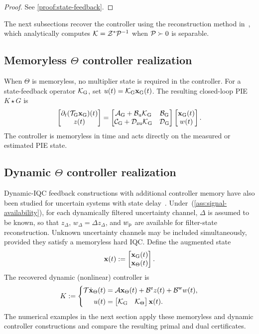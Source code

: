 \begin{proof}
    See \ref{proof:state-feedback}.
\end{proof}
The next subsections recover the controller using the reconstruction method
in~\cite[Sec.~VII]{shivaknew}, which analytically computes
$\mathcal{K}=\mathcal{Z}^*\mathcal{P}^{-1}$ when $\mathcal{P}\succ0$ is separable.

\subsection{Memoryless $\Theta$ controller realization}

When $\Theta$ is memoryless, no multiplier state is
required in the controller. For a state-feedback operator $\mathcal{K}_{{\mathrm{G}}}$, set
$u(t)=\mathcal{K}_{{\mathrm{G}}}\mathbf{x}_{{\mathrm{G}}}(t)$. The resulting closed-loop PIE
$K\star G$ is
\begin{equation*}
\begin{bmatrix}\partial_t(\mathcal{T}_{{\mathrm{G}}}\mathbf{x}_{{\mathrm{G}}})(t)\\z(t)\end{bmatrix}
=
\begin{bmatrix}
\mathcal{A}_{{\mathrm{G}}}+\mathcal{B}_{{\mathrm{u}}}\mathcal{K}_{{\mathrm{G}}}&\mathcal{B}_{{\mathrm{G}}}\\
\mathcal{C}_{{\mathrm{G}}}+\mathcal{D}_{{\mathrm{zu}}}\mathcal{K}_{{\mathrm{G}}}&\mathcal{D}_{{\mathrm{G}}}
\end{bmatrix}
\begin{bmatrix}\mathbf{x}_{{\mathrm{G}}}(t)\\w(t)\end{bmatrix}.
\end{equation*}
The controller is memoryless in time and acts directly on the measured or estimated
PIE state.

\subsection{Dynamic $\Theta$ controller realization}

Dynamic-IQC feedback constructions with additional controller memory have
also been studied for uncertain systems with state delay~\cite{7353149}.
Under~(\ref{ass:signal-availability}), for each dynamically filtered uncertainty
channel, $\Delta$ is assumed to be known, so that $z_\Delta$,
$w_\Delta=\Delta z_\Delta$, and $w_{{\mathrm{p}}}$ are available for filter-state
reconstruction. Unknown uncertainty channels may be included simultaneously,
provided they satisfy a memoryless hard IQC. Define the augmented state
\[
\mathbf{x}(t):=\begin{bmatrix}\mathbf{x}_{{\mathrm{G}}}(t)\\\mathbf{x}_\Theta(t)\end{bmatrix}.
\]
The recovered dynamic (nonlinear) controller is
\begin{equation}\label{eq:dynamic-controller-realization}
K:=\left\{
\begin{aligned}
\mathcal{T}\dot{\mathbf{x}}_\Theta(t)
&=\mathcal{A}\mathbf{x}_\Theta(t)
  +\mathcal{B}^{{\mathrm{z}}}z(t)
  +\mathcal{B}^{{\mathrm{w}}}w(t),\\
u(t)&=\begin{bmatrix}\mathcal{K}_{{\mathrm{G}}}&\mathcal{K}_\Theta\end{bmatrix}\mathbf{x}(t).
\end{aligned}
\right.
\end{equation}
The numerical examples in the next section apply these memoryless and dynamic
controller constructions and compare the resulting primal and dual
certificates.
